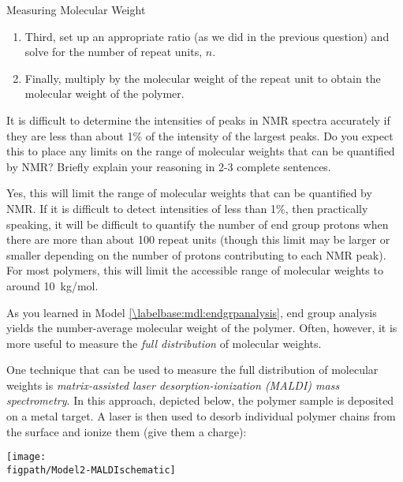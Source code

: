 \begin{activity}{Measuring Molecular Weight}
\begin{ctqs}
\begin{solution}[2in]
\begin{enumerate}
					\item Third, set up an appropriate ratio (as we did in the previous question) and solve for the number of repeat units, $n$.
				
					\item Finally, multiply by the molecular weight of the repeat unit to obtain the molecular weight of the polymer.
				\end{enumerate}
				 
			\end{solution}
		
		\question It is difficult to determine the intensities of peaks in NMR spectra accurately if they are less than about 1\% of the intensity of the largest peaks.  Do you expect this to place any limits on the range of molecular weights that can be quantified by NMR?  Briefly explain your reasoning in 2-3 complete sentences.
		
			\begin{solution}[2in]
				Yes, this will limit the range of molecular weights that can be quantified by NMR.  If it is difficult to detect intensities of less than 1\%, then practically speaking, it will be difficult to quantify the number of end group protons when there are more than about 100 repeat units (though this limit may be larger or smaller depending on the number of protons contributing to each NMR peak).  For most polymers, this will limit the accessible range of molecular weights to around 10~kg/mol.
			\end{solution}
	
\end{ctqs}



\begin{model}
	\label{\labelbase:mdl:MALDI}

	As you learned in Model \ref{\labelbase:mdl:endgrpanalysis}, end group analysis yields the number-average molecular weight of the polymer.  Often, however, it is more useful to measure the \emph{full distribution} of molecular weights.
	
	One technique that can be used to measure the full distribution of molecular weights is \emph{matrix-assisted laser desorption-ionization (MALDI) mass spectrometry}.  In this approach, depicted below, the polymer sample is deposited on a metal target.  A laser is then used to desorb individual polymer chains from the surface and ionize them (give them a charge):   
	
	\vspace{12pt}
	\centerline{\texttt{[image: \\figpath/Model2-MALDIschematic]}}
	

\end{model}
\end{activity}
